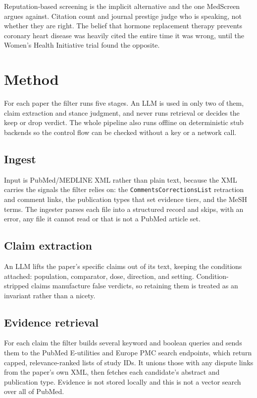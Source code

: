 \documentclass[11pt,a4paper]{article}
\begin{document}
Reputation-based screening is the implicit alternative and the one MedScreen argues against. Citation count and journal prestige judge who is speaking, not whether they are right. The belief that hormone replacement therapy prevents coronary heart disease was heavily cited the entire time it was wrong, until the Women's Health Initiative trial \citep{whi2002} found the opposite.

\section{Method}

For each paper the filter runs five stages. An LLM is used in only two of them, claim extraction and stance judgment, and never runs retrieval or decides the keep or drop verdict. The whole pipeline also runs offline on deterministic stub backends so the control flow can be checked without a key or a network call.

\subsection{Ingest}

Input is PubMed/MEDLINE XML rather than plain text, because the XML carries the signals the filter relies on: the \texttt{CommentsCorrectionsList} retraction and comment links, the publication types that set evidence tiers, and the MeSH terms. The ingester parses each file into a structured record and skips, with an error, any file it cannot read or that is not a PubMed article set.

\subsection{Claim extraction}

An LLM lifts the paper's specific claims out of its text, keeping the conditions attached: population, comparator, dose, direction, and setting. Condition-stripped claims manufacture false verdicts, so retaining them is treated as an invariant rather than a nicety.

\subsection{Evidence retrieval}

For each claim the filter builds several keyword and boolean queries and sends them to the PubMed E-utilities and Europe PMC search endpoints, which return capped, relevance-ranked lists of study IDs. It unions those with any dispute links from the paper's own XML, then fetches each candidate's abstract and publication type. Evidence is not stored locally and this is not a vector search over all of PubMed.
\end{document}
